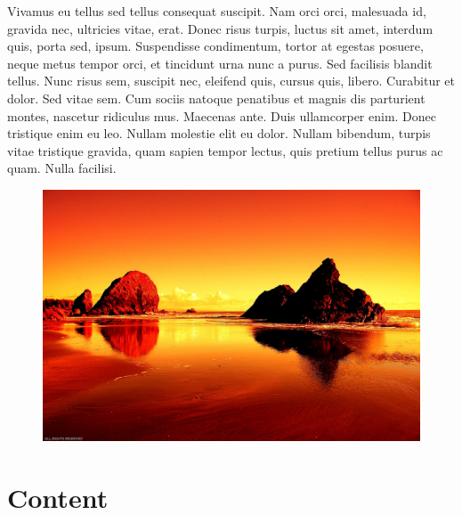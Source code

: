 \documentclass[portable]{yReport}
\begin{document}
	\lipsum[3]
	
	
	Vivamus eu tellus sed tellus consequat suscipit. Nam orci orci, malesuada
	id, gravida nec, ultricies vitae, erat. Donec risus turpis, luctus sit amet, interdum quis, porta sed, ipsum. Suspendisse condimentum, tortor at egestas
	posuere, neque metus tempor orci, et tincidunt urna nunc a purus. Sed
	facilisis blandit tellus. Nunc risus sem, suscipit nec, eleifend quis, cursus
	quis, libero. Curabitur et dolor. Sed vitae sem\sideNote{\lipsum[27]}. Cum sociis natoque penatibus et magnis dis parturient montes, nascetur ridiculus mus. Maecenas
	ante. Duis ullamcorper enim. Donec tristique enim eu leo. Nullam molestie
	elit eu dolor. Nullam bibendum, turpis vitae tristique gravida, quam sapien
	tempor lectus, quis pretium tellus purus ac quam. Nulla facilisi.
	
	\lipsum[26]
	
	\begin{figure}[ht!]
		\includegraphics[width=\linewidth]{images/sunset.jpg}
	\end{figure}
	
	
	
	\chapter{Content}
	
	\lipsum[2]
	\lipsum[3]
	
\end{document}
